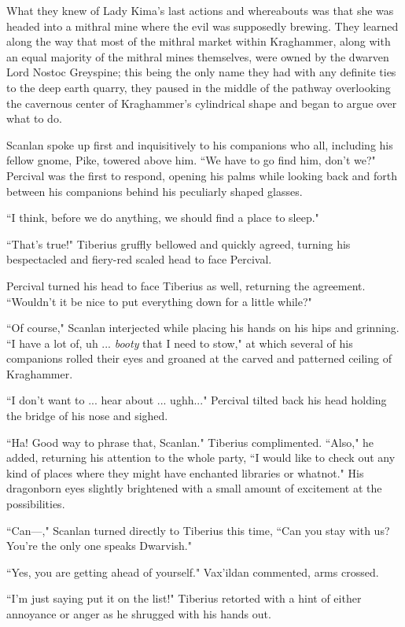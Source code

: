 What they knew of Lady Kima's last actions and whereabouts was that she was headed into a mithral mine where the evil was supposedly brewing. They learned along the way that most of the mithral market within Kraghammer, along with an equal majority of the mithral mines themselves, were owned by the dwarven Lord Nostoc Greyspine; this being the only name they had with any definite ties to the deep earth quarry, they paused in the middle of the pathway overlooking the cavernous center of Kraghammer's cylindrical shape and began to argue over what to do. 

Scanlan spoke up first and inquisitively to his companions who all, including his fellow gnome, Pike, towered above him. ``We have to go find him, don't we?" Percival was the first to respond, opening his palms while looking back and forth between his companions behind his peculiarly shaped glasses.
    
``I think, before we do anything, we should find a place to sleep."

``That's true!" Tiberius gruffly bellowed and quickly agreed, turning his bespectacled and fiery-red scaled head to face Percival.

Percival turned his head to face Tiberius as well, returning the agreement. ``Wouldn't it be nice to put everything down for a little while?" 

``Of course," Scanlan interjected while placing his hands on his hips and grinning. ``I have a lot of, uh ... \textit{booty} that I need to stow," at which several of his companions rolled their eyes and groaned at the carved and patterned ceiling of Kraghammer.

``I don't want to  ... hear about ... ughh..." Percival tilted back his head holding the bridge of his nose and sighed.

``Ha! Good way to phrase that, Scanlan." Tiberius complimented. ``Also," he added, returning his attention to the whole party, ``I would like to check out any kind of places where they might have enchanted libraries or whatnot." His dragonborn eyes slightly brightened with a small amount of excitement at the possibilities.

``Can---," Scanlan turned directly to Tiberius this time, ``Can you stay with us? You're the only one speaks Dwarvish."

``Yes, you are getting ahead of yourself." Vax'ildan commented, arms crossed.

``I'm just saying put it on the list!" Tiberius retorted with a hint of either annoyance or anger as he shrugged with his hands out.

